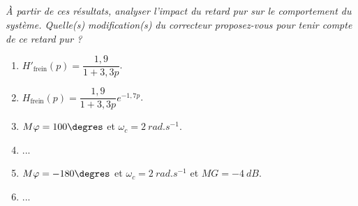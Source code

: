 \subparagraph{}
\textit{À partir de ces résultats, analyser l’impact du retard pur sur le comportement du système. Quelle(s)
modification(s) du correcteur proposez-vous pour tenir compte de ce retard pur ?}
\ifprof
\begin{corrige}
\end{corrige}
\else
\fi

\begin{enumerate}
\item $H'_{\text{frein}} ( p) = \dfrac{1,9}{1+3,3 p} $.
\item $H_{\text{frein}} ( p) = \dfrac{1,9}{1+3,3 p} e^{-1,7 p}$.
\item $M\varphi = 100\degres$ et $\omega_c = \SI{2}{rad.s^{-1}}$.
\item ...
\item $M\varphi = -180\degres$ et $\omega_c = \SI{2}{rad.s^{-1}}$ et $MG = \SI{-4}{dB}$.
\item ...
\end{enumerate}